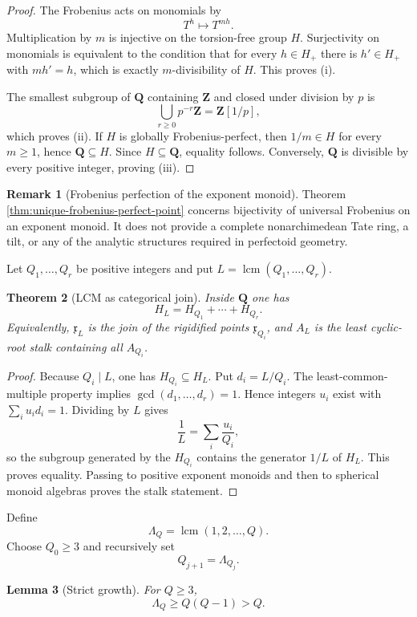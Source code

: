 \documentclass[11pt]{amsart}
\numberwithin{equation}{section}
\newtheorem{theorem}{Theorem}[section]
\newtheorem{lemma}[theorem]{Lemma}
\theoremstyle{definition}
\newtheorem{remark}[theorem]{Remark}
\newcommand{\Z}{\mathbf Z}
\newcommand{\Q}{\mathbf Q}
\begin{document}
\begin{proof}
The Frobenius acts on monomials by
\[
T^h\longmapsto T^{mh}.
\]
Multiplication by $m$ is injective on the torsion-free group $H$.
Surjectivity on monomials is equivalent to the condition that for every
$h\in H_+$ there is $h'\in H_+$ with $mh'=h$, which is exactly
$m$-divisibility of $H$.  This proves (i).

The smallest subgroup of $\Q$ containing $\Z$ and closed under division
by $p$ is
\[
\bigcup_{r\geq0}p^{-r}\Z=\Z[1/p],
\]
which proves (ii).  If $H$ is globally Frobenius-perfect, then
$1/m\in H$ for every $m\geq1$, hence $\Q\subseteq H$.  Since
$H\subseteq\Q$, equality follows.  Conversely, $\Q$ is divisible by every
positive integer, proving (iii).
\end{proof}

\begin{remark}[Frobenius perfection of the exponent monoid]
Theorem \ref{thm:unique-frobenius-perfect-point} concerns bijectivity of
universal Frobenius on an exponent monoid.  It does not provide a complete
nonarchimedean Tate ring, a tilt, or any of the analytic structures required
in perfectoid geometry.
\end{remark}

Let $Q_1,\dots,Q_r$ be positive integers and put
$L=\operatorname{lcm}(Q_1,\dots,Q_r)$.

\begin{theorem}[LCM as categorical join]
\label{thm:lcm-join}
Inside $\Q$ one has
\[
H_L=H_{Q_1}+\cdots+H_{Q_r}.
\]
Equivalently, $\mathfrak x_L$ is the join of the rigidified points
$\mathfrak x_{Q_i}$, and $A_L$ is the least cyclic-root stalk containing
all $A_{Q_i}$.
\end{theorem}

\begin{proof}
Because $Q_i\mid L$, one has $H_{Q_i}\subseteq H_L$.  Put $d_i=L/Q_i$.
The least-common-multiple property implies
$\gcd(d_1,\dots,d_r)=1$.  Hence integers $u_i$ exist with
$\sum_i u_id_i=1$.  Dividing by $L$ gives
\[
\frac1L=\sum_i\frac{u_i}{Q_i},
\]
so the subgroup generated by the $H_{Q_i}$ contains the generator $1/L$
of $H_L$.  This proves equality.  Passing to positive exponent monoids and
then to spherical monoid algebras proves the stalk statement.
\end{proof}

Define
\[
\Lambda_Q=\operatorname{lcm}(1,2,\dots,Q).
\]
Choose $Q_0\geq3$ and recursively set
\[
Q_{j+1}=\Lambda_{Q_j}.
\]

\begin{lemma}[Strict growth]
\label{lem:lcm-growth}
For $Q\geq3$,
\[
\Lambda_Q\geq Q(Q-1)>Q.
\]
\end{lemma}
\end{document}
